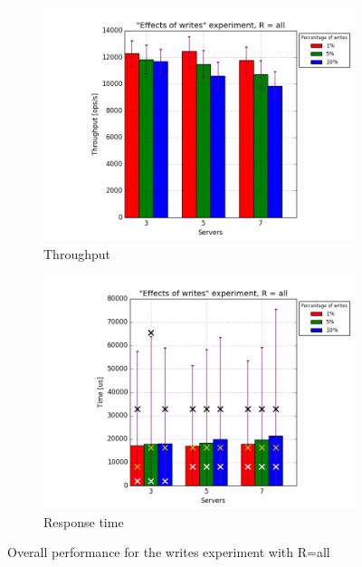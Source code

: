 \documentclass[11pt]{article}
\begin{document}
\begin{figure}
\centering
\begin{subfigure}{.5\textwidth}
	\centering
	\includegraphics[width=\linewidth]{plots/writes-2-replication}
	\caption{Throughput}
	\label{fig:writes-throughput-2}
\end{subfigure}%
\begin{subfigure}{.5\textwidth}
	\centering
	\includegraphics[width=\linewidth]{plots/writes-response_time-2-replication}
	\caption{Response time}
	\label{fig:writes-reponse-time-2}
\end{subfigure}
\caption{Overall performance for the writes experiment with R=all}
\label{fig:writes-overall-all}
\end{figure}
\end{document}
